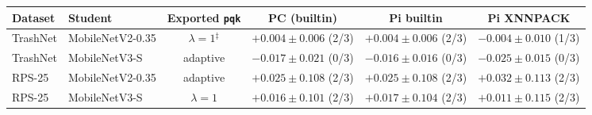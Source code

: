 \begin{tabular}{@{}llcccc@{}}
\toprule
Dataset & Student & Exported \texttt{pqk} & PC (builtin) & Pi builtin & Pi XNNPACK \\
\midrule
TrashNet & MobileNetV2-0.35 & $\lambda{=}1$$^{\ddagger}$ & $+0.004\pm0.006$ (2/3) & $+0.004\pm0.006$ (2/3) & $-0.004\pm0.010$ (1/3) \\
TrashNet & MobileNetV3-S & adaptive & $-0.017\pm0.021$ (0/3) & $-0.016\pm0.016$ (0/3) & $-0.025\pm0.015$ (0/3) \\
RPS-25 & MobileNetV2-0.35 & adaptive & $+0.025\pm0.108$ (2/3) & $+0.025\pm0.108$ (2/3) & $+0.032\pm0.113$ (2/3) \\
RPS-25 & MobileNetV3-S & $\lambda{=}1$ & $+0.016\pm0.101$ (2/3) & $+0.017\pm0.104$ (2/3) & $+0.011\pm0.115$ (2/3) \\
\bottomrule
\end{tabular}
